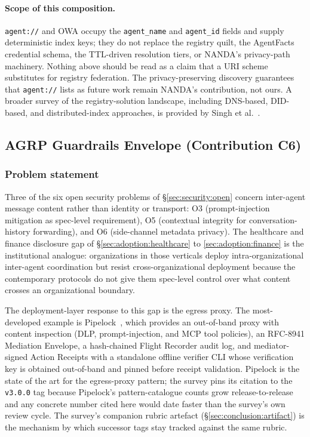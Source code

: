 \paragraph{Scope of this composition.}
\texttt{agent://} and OWA occupy the
\texttt{agent\_name} and \texttt{agent\_id} fields and
supply deterministic index keys; they do not replace
the registry quilt, the AgentFacts credential schema,
the TTL-driven resolution tiers, or NANDA's
privacy-path machinery. Nothing above should be read as a
claim that a URI scheme substitutes for registry
federation. The privacy-preserving discovery guarantees
that \texttt{agent://} lists as future work remain
NANDA's contribution, not ours. A broader survey of the
registry-solution landscape, including DNS-based,
DID-based, and distributed-index approaches, is provided
by Singh et al.~\cite{agent_registry_evolution}.

\subsection{AGRP Guardrails Envelope (Contribution C6)}
\label{sec:proposals:agrp}

\subsubsection{Problem statement}
\label{sec:proposals:agrp:problem}

Three of the six open security problems of
\S\ref{sec:security:open} concern inter-agent message
content rather than identity or transport:
O3 (prompt-injection mitigation as spec-level requirement),
O5 (contextual integrity for conversation-history
forwarding), and O6 (side-channel metadata privacy). The
healthcare and finance disclosure gap of
\S\ref{sec:adoption:healthcare} to \ref{sec:adoption:finance}
is the institutional analogue: organizations in those
verticals deploy intra-organizational inter-agent
coordination but resist cross-organizational deployment
because the contemporary protocols do not give them
spec-level control over what content crosses an
organizational boundary.

The deployment-layer response to this gap is the egress
proxy. The most-developed example is
Pipelock~\cite{pipelock}, which provides an out-of-band
proxy with content inspection (DLP, prompt-injection, and
MCP tool policies), an RFC-8941 Mediation Envelope, a
hash-chained Flight Recorder audit log, and
mediator-signed Action Receipts with a standalone offline
verifier CLI whose verification key is obtained
out-of-band and pinned before receipt validation. Pipelock is the
state of the art for the egress-proxy pattern; the survey
pins its citation to the \texttt{v3.0.0} tag because
Pipelock's pattern-catalogue counts grow release-to-release
and any concrete number cited here would date faster
than the survey's own review cycle. The survey's
companion rubric artefact (\S\ref{sec:conclusion:artifact})
is the mechanism by which successor tags stay tracked
against the same rubric.

